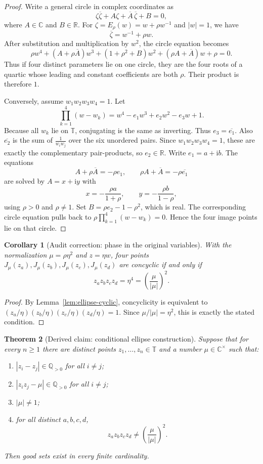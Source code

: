 \documentclass[11pt]{article}
\newtheorem{theorem}{Theorem}
\newtheorem{corollary}[theorem]{Corollary}
\theoremstyle{definition}
\theoremstyle{remark}
\newcommand{\C}{\mathbb{C}}
\newcommand{\Q}{\mathbb{Q}}
\newcommand{\R}{\mathbb{R}}
\newcommand{\T}{\mathbb{T}}
\newcommand{\ii}{\mathrm{i}}
\newcommand{\abs}[1]{\left|#1\right|}
\begin{document}
\begin{proof}
Write a general circle in complex coordinates as
\[
\zeta\overline{\zeta}+A\zeta+\overline A\,\overline\zeta+B=0,
\]
where \(A\in\C\) and \(B\in\R\).  For \(\zeta=E_\rho(w)=w+\rho w^{-1}\) and
\(\abs w=1\), we have
\[
\overline\zeta=w^{-1}+\rho w.
\]
After substitution and multiplication by \(w^2\), the circle equation becomes
\[
\rho w^4+(A+\rho\overline A)w^3+(1+\rho^2+B)w^2
+(\rho A+\overline A)w+\rho=0.
\]
Thus if four distinct parameters lie on one circle, they are the four roots of
a quartic whose leading and constant coefficients are both \(\rho\).  Their
product is therefore \(1\).

Conversely, assume \(w_1w_2w_3w_4=1\).  Let
\[
\prod_{k=1}^4(w-w_k)=w^4-e_1w^3+e_2w^2-e_3w+1.
\]
Because all \(w_k\) lie on \(\T\), conjugating is the same as inverting.  Thus
\(e_3=\overline{e_1}\).  Also \(\overline{e_2}\) is the sum of
\(\frac{1}{w_i w_j}\) over the six unordered pairs.  Since
\(w_1w_2w_3w_4=1\), these are exactly the complementary pair-products, so
\(e_2\in\R\).  Write \(e_1=a+\ii b\).  The equations
\[
A+\rho\overline A=-\rho e_1,
\qquad
\rho A+\overline A=-\rho\overline{e_1}
\]
are solved by \(A=x+\ii y\) with
\[
x=-\frac{\rho a}{1+\rho},
\qquad
y=-\frac{\rho b}{1-\rho},
\]
using \(\rho>0\) and \(\rho\ne 1\).  Set \(B=\rho e_2-1-\rho^2\), which is real.
The corresponding circle equation pulls back to
\(\rho\prod_{k=1}^4(w-w_k)=0\).  Hence the four image points lie on that circle.
\end{proof}

\begin{corollary}[Audit correction: phase in the original variables]\label{cor:phase-correction}
With the normalization \(\mu=\rho\eta^2\) and \(z=\eta w\), four points
\(J_\mu(z_a),J_\mu(z_b),J_\mu(z_c),J_\mu(z_d)\) are concyclic if and only if
\[
z_a z_b z_c z_d=\eta^4={\left(\frac{\mu}{\abs\mu}\right)}^2.
\]
\end{corollary}

\begin{proof}
By Lemma~\ref{lem:ellipse-cyclic}, concyclicity is equivalent to
\((z_a/\eta)(z_b/\eta)(z_c/\eta)(z_d/\eta)=1\).  Since
\(\mu/\abs\mu=\eta^2\), this is exactly the stated condition.
\end{proof}

\begin{theorem}[Derived claim: conditional ellipse construction]\label{thm:ellipse-conditional}
Suppose that for every \(n\ge 1\) there are distinct points
\(z_1,\ldots,z_n\in\T\) and a number \(\mu\in\C^\times\) such that:
\begin{enumerate}
\item \(\abs{z_i-z_j}\in\Q_{>0}\) for all \(i\ne j\);
\item \(\abs{z_i z_j-\mu}\in\Q_{>0}\) for all \(i\ne j\);
\item \(\abs\mu\ne 1\);
\item for all distinct \(a,b,c,d\),
\[
z_a z_b z_c z_d\ne {\left(\frac{\mu}{\abs\mu}\right)}^2.
\]
\end{enumerate}
Then good sets exist in every finite cardinality.
\end{theorem}
\end{document}
